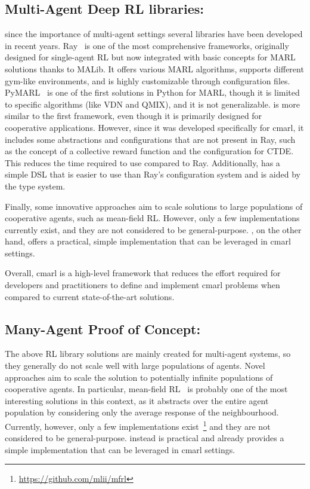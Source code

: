 \subsection{Multi-Agent Deep RL libraries:}
since the importance of multi-agent settings several libraries have been developed in recent years. 
Ray~\cite{ray} is one of the most comprehensive frameworks, 
 originally designed for single-agent RL but 
 now integrated with basic concepts for MARL solutions thanks to MALib. 
It offers various MARL algorithms,
 supports different gym-like environments, 
 and is highly customizable through configuration files. 
%
PyMARL~\cite{samvelyan19smac} is one of the first solutions in Python for MARL, 
 though it is limited to specific algorithms (like VDN and QMIX), 
 and it is not generalizable. 
%
\scarlib{} is more similar to the first framework, 
 even though it is primarily designed for cooperative applications. 
%
However, since it was developed specifically for \ac{cmarl}, 
 it includes some abstractions and configurations that are not present in Ray, 
 such as the concept of a collective reward function and the configuration for CTDE. 
%
This reduces the time required to use \scarlib{} compared to Ray. 
 Additionally, \scarlib{} has a simple DSL that is easier to use than Ray's configuration system and is aided by the type system.

Finally, some innovative approaches aim to scale solutions to large populations of cooperative agents, such as mean-field RL. However, only a few implementations currently exist, and they are not considered to be general-purpose. \scarlib{}, on the other hand, offers a practical, simple implementation that can be leveraged in \ac{cmarl} settings.

Overall, \ac{cmarl} is a high-level framework that reduces the effort required for developers and practitioners to define and implement \ac{cmarl} problems when compared to current state-of-the-art solutions.

\subsection{Many-Agent Proof of Concept:}
The above RL library solutions are mainly created for multi-agent systems, 
 so they generally do not scale well with large populations of agents. 
 Novel approaches aim to scale the solution to potentially infinite populations of cooperative agents. 
In particular, mean-field RL~\cite{meanfield} is probably one of the 
 most interesting solutions in this context, 
 as it abstracts over the entire agent population 
 by considering only the average response of the neighbourhood. 
%
Currently, however, only a few implementations 
 exist~\footnote{\url{https://github.com/mlii/mfrl}} and they are not considered to be general-purpose. 
 \scarlib{} instead is practical and already provides a simple implementation that can be leveraged in \ac{cmarl} settings. 

